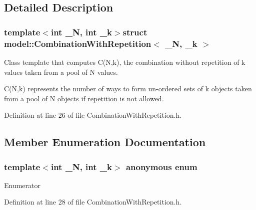 \subsection{Detailed Description}
\subsubsection*{template$<$int \+\_\+\+N, int \+\_\+k$>$struct model\+::\+Combination\+With\+Repetition$<$ \+\_\+\+N, \+\_\+k $>$}

Class template that computes C(\+N,k), the combination without repetition of k values taken from a pool of N values.

C(\+N,k) represents the number of ways to form un-\/ordered sets of k objects taken from a pool of N objects if repetition is not allowed. 

Definition at line 26 of file Combination\+With\+Repetition.\+h.



\subsection{Member Enumeration Documentation}
\hypertarget{structmodel_1_1_combination_with_repetition_a5aa11104ddc03bc31178591d5f907d63}{}\subsubsection[{anonymous enum}]{\setlength{\rightskip}{0pt plus 5cm}template$<$int \+\_\+\+N, int \+\_\+k$>$ anonymous enum}\label{structmodel_1_1_combination_with_repetition_a5aa11104ddc03bc31178591d5f907d63}
\begin{Desc}
\item[Enumerator]\par
\begin{description}
\item[{\em 
\hypertarget{structmodel_1_1_combination_with_repetition_a5aa11104ddc03bc31178591d5f907d63a4e5bdab5c740f9c3a381f08dd5c42dd2}{}N\label{structmodel_1_1_combination_with_repetition_a5aa11104ddc03bc31178591d5f907d63a4e5bdab5c740f9c3a381f08dd5c42dd2}
}]\end{description}
\end{Desc}


Definition at line 28 of file Combination\+With\+Repetition.\+h.


